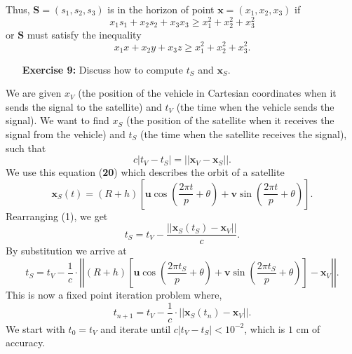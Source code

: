 \documentclass[11pt]{article}
\theoremstyle{definition}
\newcommand{\1}[1]{\mathbf{1} \left \{ #1 \right \}}
\begin{document}
Thus, $\textbf{S} = (s_1, s_2, s_3)$ is in the horizon of point $\textbf{x} = (x_1, x_2, x_3)$ if
\[x_1s_1 + x_2s_2 + x_3x_3 \geq x_1^2 + x_2^2 + x_3^2\]
or $\textbf{S}$ must satisfy the inequality
\[x_1x + x_2y + x_3z \geq x_1^2 + x_2^2 + x_3^2.\]

\begin{itemize}
\item[{\textbf{Exercise 9:}}] Discuss how to compute $t_S$ and $\textbf{x}_S$.
\end{itemize}
We are given $x_V$ (the position of the vehicle in Cartesian coordinates when it sends the signal to the satellite) and $t_V$ (the time when the vehicle sends the signal).  We want to find $x_S$ (the position of the satellite when it receives the signal from the vehicle) and $t_S$ (the time when the satellite receives the signal), such that
\begin{equation}
    c|t_V - t_S| = ||\textbf{x}_V - \textbf{x}_S||.
\end{equation}
We use this equation (\textbf{20}) which describes the orbit of a satellite
\begin{equation}
    \textbf{x}_S (t) = (R+h) \left[\textbf{u}\cos \left(\frac{2\pi t}{p} + \theta \right) + \textbf{v}\sin \left(\frac{2\pi t}{p} + \theta \right)\right].
\end{equation}
Rearranging (1), we get
\[t_S = t_V - \frac{\left|\big|\textbf{x}_S (t_S) - \textbf{x}_V\big|\right|}{c}.\]
By substitution we arrive at
\[t_S = t_V - \frac{1}{c} \cdot \left|\left|(R+h) \left[\textbf{u}\cos \left(\frac{2\pi t_S}{p} + \theta \right) + \textbf{v}\sin \left(\frac{2\pi t_S}{p} + \theta \right)\right] - \textbf{x}_V\right|\right|.\]
This is now a fixed point iteration problem where,
\[t_{n+1} = t_V - \frac{1}{c} \cdot \left|\big|\textbf{x}_S (t_n) - \textbf{x}_V\big|\right|.\]
We start with $t_0 = t_V$ and iterate until \(c|t_V - t_S| < 10^{-2}\), which is $1$ cm of accuracy.
\end{document}
